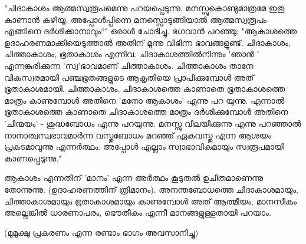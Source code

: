 "ചിദാകാശം ആത്മസ്വരൂപമെന്നു പറയപ്പെടുന്നു. മനസ്സുകൊണ്ടുമാത്രമേ ഇതു കാണാന്‍ കഴിയൂ. അപ്പോള്‍പ്പിന്നെ മനസ്സൊടുങ്ങിയാല്‍ ആത്മസ്വരൂപം എങ്ങിനെ ദര്‍ശിക്കാനാവും?" ഒരാള്‍ ചോദിച്ചു. ഭഗവാന്‍ പറഞ്ഞു: "ആകാശത്തെ ഉദാഹരണമാക്കിയെടുത്താല്‍ അതിന്‌ മൂന്നു വിഭിന്ന ഭാവങ്ങളുണ്ട്‌. ചിദാകാശം, ചിത്താകാശം, ഭൂതാകാശം എന്നിവ. ചിദാകാശത്തില്‍നിന്നും 'ഞാന്‍ ' എന്നങ്കുരിക്കുന്ന 'സ്വ'ഭാവമാണ്‌ ചിത്താകാശം. ചിത്താകാശം താനേ വികസ്വരമായി പഞ്ചഭൂതങ്ങളുടെ ആകൃതിയെ പ്രാപിക്കുമ്പോള്‍ അത്‌ ഭൂതാകാശമായി. ചിത്താകാശം, ചിദാകാശത്തെ കാണാതെ ഭൂതാകാശത്തെ മാത്രം കാണുമ്പോള്‍ അതിനെ 'മനോ ആകാശം' എന്നു പറ യുന്നു. എന്നാല്‍ ഭൂതാകാശത്തെ കാണാതെ ചിദാകാശത്തെ മാത്രം ദര്‍ശിക്കുമ്പോള്‍ അതിനെ 'ചിന്മയം' - ശുദ്ധബോധം എന്നു പറയുന്നു. മനസ്സു വിലയിക്കുന്നു എന്നു പറഞ്ഞാല്‍ നാനാത്വസ്വഭാവമാര്‍ന്ന വസ്തുബോധം മറഞ്ഞ്‌ ഏകവസ്തു എന്ന ആശയം പ്രകടമാവുന്നു എന്നര്‍ത്ഥം. അപ്പോള്‍ എല്ലാം സ്വാഭാവികമായും സ്വരൂപമായി കാണപ്പെടുന്നു."

ആകാശം എന്നതിന്‌ 'മാനം' എന്ന അര്‍ത്ഥം കൂടുതല്‍ ഉചിതമാണെന്നു തോന്നുന്നു. (ഉദാഹരണത്തിന്‌ ത്രിമാനം). അനന്തബോധത്തെ ചിദാകാശമായും, ചിത്താകാശമായും ഭൂതാകാശമായും കാണുമ്പോള്‍ അത്‌ ആത്മീയം, മാനസീകം അല്ലെങ്കില്‍ ധാരണാപരം, ഭൌതീകം എന്നീ മാനങ്ങളുള്ളതായി പറയാം.

(മുമുക്ഷു പ്രകരണം എന്ന രണ്ടാം ഭാഗം അവസാനിച്ചു)
